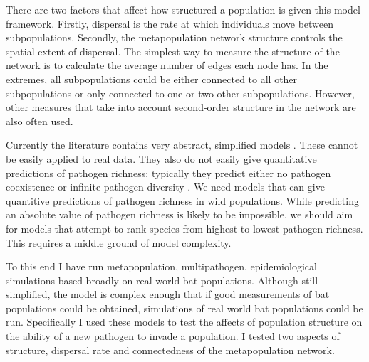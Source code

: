 There are two factors that affect how structured a population is given this model framework.
Firstly, dispersal is the rate at which individuals move between subpopulations.
Secondly, the metapopulation network structure controls the spatial extent of dispersal.
The simplest way to measure the structure of the network is to calculate the average number of edges each node has.
In the extremes, all subpopulations could be either connected to all other subpopulations or only connected to one or two other subpopulations.
However, other measures that take into account second-order structure in the network are also often used.






Currently the literature contains very abstract, simplified models \cite{qiu2013vector, allen2004sis, nunes2006localized, garmer2016multistrain}.
These cannot be easily applied to real data.
They also do not easily give quantitative predictions of pathogen richness; typically they predict either no pathogen coexistence \cite{bremermann1989competitive, martcheva2013competitive} or infinite pathogen diversity \cite{may1994superinfection}.
We need models that can give quantitive predictions of pathogen richness in wild populations.
While predicting an absolute value of pathogen richness is likely to be impossible, we should aim for models that attempt to rank species from highest to lowest pathogen richness.
This requires a middle ground of model complexity.


To this end I have run metapopulation, multipathogen, epidemiological simulations based broadly on real-world bat populations.
Although still simplified, the model is complex enough that if good measurements of bat populations could be obtained, simulations of real world bat populations could be run.
Specifically I used these models to test the affects of population structure on the ability of a new pathogen to invade a population.
I tested two aspects of structure, dispersal rate and connectedness of the metapopulation network.



